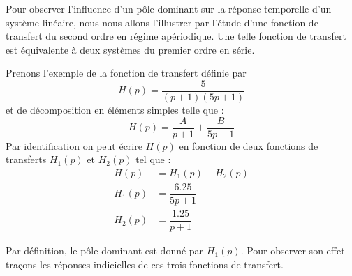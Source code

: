 Pour observer l'influence d'un pôle dominant sur 
la réponse temporelle d'un système linéaire, nous
nous allons l'illustrer par l'étude d'une fonction 
de transfert du second ordre en régime apériodique.
Une telle fonction de transfert est équivalente à deux
systèmes du premier ordre en série.

Prenons l'exemple de la fonction de transfert définie par  
$$
H(p)=\dfrac{5}{(p+1)(5p+1)}
$$
et de décomposition en éléments simples telle que :
$$
H(p)=\dfrac{A}{p+1}+\dfrac{B}{5p+1}
$$
Par identification on peut écrire $H(p)$ en fonction de
deux fonctions de transferts $H_1(p)$ et $H_2(p)$ tel que :
\begin{align*}
	H(p)&=H_1(p)-H_2(p)\\
	H_1(p)&=\dfrac{6.25}{5p+1}\\
	H_2(p)&=\dfrac{1.25}{p+1}
\end{align*}

Par définition, le pôle dominant est donné par $H_1(p)$.
Pour observer son effet traçons les réponses indicielles 
de ces trois fonctions de transfert.

\begin{figure}[!h]
\begin{center}
{\tikzset{external/export=false}       
}
\end{center}
\caption{}
\end{figure}

\begin{center}
{\tikzset{external/export=false}       
}
\end{center}


